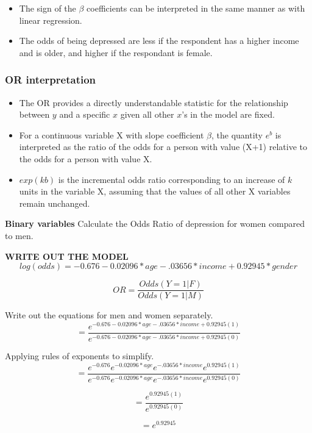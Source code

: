 \documentclass[]{article}
\begin{document}
\begin{itemize}
\itemsep1pt\parskip0pt
\item
  The sign of the \(\beta\) coefficients can be interpreted in the same
  manner as with linear regression.
\item
  The odds of being depressed are less if the respondent has a higher
  income and is older, and higher if the respondant is female.
\end{itemize}

\subsubsection{OR interpretation}\label{or-interpretation}

\begin{itemize}
\itemsep1pt\parskip0pt
\item
  The OR provides a directly understandable statistic for the
  relationship between \(y\) and a specific \(x\) given all other
  \(x\)'s in the model are fixed.
\item
  For a continuous variable X with slope coefficient \(\beta\), the
  quantity \(e^{b}\) is interpreted as the ratio of the odds for a
  person with value (X+1) relative to the odds for a person with value
  X.
\item
  \(exp(kb)\) is the incremental odds ratio corresponding to an increase
  of \(k\) units in the variable X, assuming that the values of all
  other X variables remain unchanged.
\end{itemize}

\textbf{Binary variables} Calculate the Odds Ratio of depression for
women compared to men.

\textbf{WRITE OUT THE MODEL}
\[log(odds) = -0.676 - 0.02096*age - .03656*income + 0.92945*gender\]

\[ OR = \frac{Odds (Y=1|F)}{Odds (Y=1|M)} \]

Write out the equations for men and women separately.
\[ = \frac{e^{-0.676 - 0.02096*age - .03656*income + 0.92945(1)}}
          {e^{-0.676 - 0.02096*age - .03656*income + 0.92945(0)}}\]

Applying rules of exponents to simplify.
\[ = \frac{e^{-0.676}e^{- 0.02096*age}e^{- .03656*income}e^{0.92945(1)}}
          {e^{-0.676}e^{- 0.02096*age}e^{- .03656*income}e^{0.92945(0)}}\]

\[ = \frac{e^{0.92945(1)}}
          {e^{0.92945(0)}}\]

\[ = e^{0.92945} \]
\end{document}
